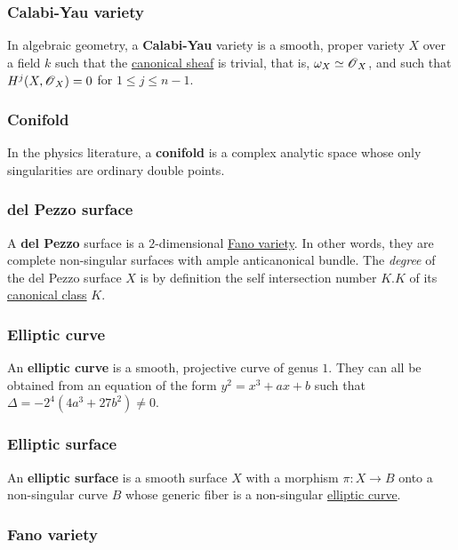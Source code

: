 \documentclass[11pt, english]{article}
\begin{document}
\subsubsection{Calabi-Yau variety}

In algebraic geometry, a \textbf{Calabi-Yau} variety is a smooth, proper variety $X$ over a field $k$ such that the \hyperref[canonicaldivisor]{canonical sheaf} is trivial, that is, $\omega_X \simeq \operatorname{\mathscr{O}}_X$, and such that $H^j(X,\operatorname{\mathscr{O}}_X)=0$ for $1 \leq j \leq n-1$. 

\subsubsection{Conifold}
\label{conifold}

In the physics literature, a \textbf{conifold} is a complex analytic space whose only singularities are ordinary double points. 

\subsubsection{del Pezzo surface}
\label{delpezzo}

A \textbf{del Pezzo} surface is a $2$-dimensional \hyperref[fano]{Fano variety}. In other words, they are complete non-singular surfaces with ample anticanonical bundle. The \emph{degree} of the del Pezzo surface $X$ is by definition the self intersection number $K.K$ of its \hyperref[canonicaldivisor]{canonical class} $K$. 

\subsubsection{Elliptic curve}
\label{ellipticc}

An \textbf{elliptic curve} is a smooth, projective curve of genus $1$. They can all be obtained from an equation of the form $y^2=x^3+ax+b$ such that $\Delta = -2^4(4a^3+27b^2) \neq 0$. 

\subsubsection{Elliptic surface}
\label{elliptics}

An \textbf{elliptic surface} is a smooth surface $X$ with a morphism $\pi:X \to B$ onto a non-singular curve $B$ whose generic fiber is a non-singular \hyperref[ellipticc]{elliptic curve}.

\subsubsection{Fano variety}
\label{fano}
\end{document}
